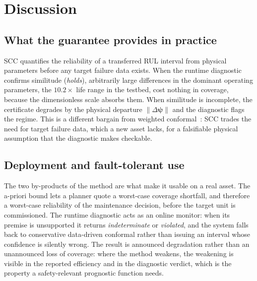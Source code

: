 \section{Discussion}\label{sec:discussion}
\subsection{What the guarantee provides in practice}\label{sec:disc-buys}
SCC quantifies the reliability of a transferred RUL interval from physical parameters before any
target failure data exists. When the runtime diagnostic confirms similitude (\emph{holds}),
arbitrarily large differences in the dominant operating parameters, the $10.2\times$ life range in
the testbed, cost nothing in coverage, because the dimensionless scale absorbs them. When similitude
is incomplete, the certificate degrades by the physical departure $\lVert\Delta\boldsymbol\psi\rVert$
and the diagnostic flags the regime. This is a different bargain from weighted
conformal~\cite{tibshirani2019conformal}: SCC trades the need for target failure data, which a new
asset lacks, for a falsifiable physical assumption that the diagnostic makes checkable.

\subsection{Deployment and fault-tolerant use}\label{sec:disc-deploy}
The two by-products of the method are what make it usable on a real asset. The a-priori bound lets a
planner quote a worst-case coverage shortfall, and therefore a worst-case reliability of the
maintenance decision, before the target unit is commissioned. The runtime diagnostic acts as an
online monitor: when its premise is unsupported it returns \emph{indeterminate} or \emph{violated},
and the system falls back to conservative data-driven conformal rather than issuing an interval whose
confidence is silently wrong. The result is announced degradation rather than an unannounced loss
of coverage: where the method weakens, the weakening is visible in the reported efficiency and in
the diagnostic verdict, which is the property a safety-relevant prognostic function needs.

